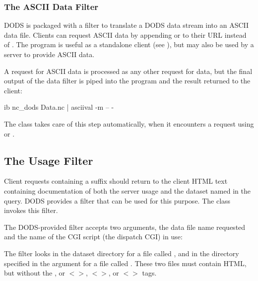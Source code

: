 \subsubsection{The ASCII Data Filter}
DODS is packaged with a filter to translate a DODS data stream into an
ASCII data file.  Clients can request ASCII data by appending
 or  to their URL instead of .  The
 program is useful as a standalone client (see
\OPDuser), but may also be used by a server to provide ASCII data.

A request for ASCII data is processed as any other request for data,
but the final output of the data filter is  piped into the 
program and the result returned to the client:

\begin{vcode}{ib}
nc_dods Data.nc | asciival -m -- -
\end{vcode}

\noindent
The  class takes care of this step automatically,
when it encounters a request using  or .


\subsection{The Usage Filter}
\label{sec,usage}

Client requests containing a  suffix should return to the
client HTML text containing documentation of both the server usage and
the dataset named in the query.  DODS provides a  filter
that can be used for this purpose.  The  class
invokes this filter.

The DODS-provided  filter accepts two arguments, the data
file name requested and the name of the CGI script (the dispatch CGI)
in use:

\begin{example}
  
\end{example}

\noindent
The  filter looks in the dataset directory for a file
called , and in the directory specified in
the  argument for a file called
.  These two files must contain HTML, but
without the 
\W{},  or  
\T$<$$>$, $<$$>$, or $<$$>$
tags.


